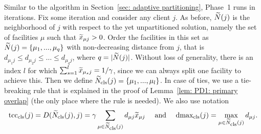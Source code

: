 Similar to the algorithm in Section~\ref{sec: adaptive partitioning},
Phase~1 runs in iterations. Fix some iteration and consider any client
$j$.  As before, ${\widetilde N}(j)$ is the neighborhood of $j$ with respect
to the yet unpartitioned solution, namely the set of facilities $\mu$
such that ${\widetilde x}_{\mu j}>0$. Order the facilities in this set as
${\widetilde N}(j) = { \left\{ \mu_1,...,\mu_q \right\} }$ with non-decreasing distance
from $j$, that is $d_{\mu_1 j} \leq d_{\mu_2 j} \leq \ldots \leq
d_{\mu_q j}$, where $q = |{\widetilde N}(j)|$. Without loss of generality,
there is an index $l$ for which $\sum_{s=1}^l {\widetilde x}_{\mu_s j} =
1/\gamma$, since we can always split one facility to achieve
this. Then we define ${\widetilde N}_{{\mbox{\scriptsize\rm cls}}}(j) = { \left\{ \mu_1,...,\mu_l \right\} }$. In
case of ties, we use a tie-breaking rule that is explained in the
proof of Lemma~\ref{lem: PD1: primary overlap} (the only place where
the rule is needed). We also use notation
%
\begin{equation*}
\mbox{\rm{tcc}}_{{\mbox{\scriptsize\rm cls}}}(j) =  D({\widetilde N}_{{\mbox{\scriptsize\rm cls}}}(j), j) = \gamma\sum_{\mu\in{\widetilde N}_{{\mbox{\scriptsize\rm cls}}}(j)} d_{\mu j} {\widetilde x}_{\mu j}
			\quad\textrm{ and }\quad
 \mbox{\rm{dmax}}_{{\mbox{\scriptsize\rm cls}}}(j) = \max_{\mu \in {\widetilde N}_{{\mbox{\scriptsize\rm cls}}}(j)} d_{\mu j}. 
\end{equation*}
%

